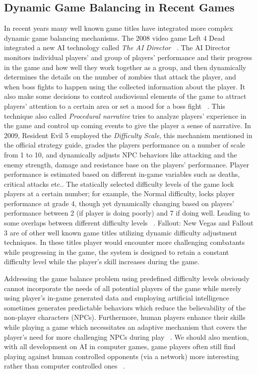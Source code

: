 \subsection{Dynamic Game Balancing in Recent Games}
In recent years many well known game titles have integrated more complex dynamic game balancing mechanisms. The 2008 video game Left 4 Dead integrated a new AI technology called \textit{The AI Director} ~\cite{left2008dead}. The AI Director monitors individual players' and group of players' performance and their progress in the game and how well they work together as a group, and then dynamically determines the details on the number of zombies that attack the player, and when boss fights to happen using the collected information about the player. It also make some decisions to control audiovisual elements of the game to attract players' attention to a certain area or set a mood for a boss fight ~\cite{left4dead2009handson}. This technique also called \textit{Procedural narrative} tries to analyze players' experience in the game and control up coming events to give the player a sense of narrative. In 2009, Resident Evil 5 employed the \textit{Difficulty Scale}, this mechanism mentioned in the official strategy guide, grades the players performance on a number of scale from 1 to 10, and dynamically adjusts NPC behaviors like attacking and the enemy strength, damage and resistance base on the players' performance. Player performance is estimated based on different in-game variables such as deaths, critical attacks etc.. The statically selected difficulty levels of the game lock players at a certain number; for example, the Normal difficulty, locks player performance at grade 4, though yet dynamically changing based on players' performance between 2 (if player is doing poorly) and 7 if doing well. Leading to some overlaps between different difficulty levels ~\cite{resident2009evil}. Fallout: New Vegas and Fallout 3 are of other well known game titles utilizing dynamic difficulty adjustment techniques. In these titles player would encounter more challenging combatants while progressing in the game, the system is designed to retain a constant difficulty level while the player's skill increases during the game.

Addressing the game balance problem using predefined difficulty levels obviously cannot incorporate the needs of all potential players of the game while merely using player's in-game generated data and employing artificial intelligence sometimes generates predictable behaviors which reduce the believability of the non-player characters (NPCs). Furthermore, human players enhance their skills while playing a game which necessitates an adaptive mechanism that covers the player's need for more challenging NPCs during play ~\cite{olesen2008real}. We should also mention, with all development on AI in computer games, game players often still find playing against human controlled opponents (via a network) more interesting rather than computer controlled ones ~\cite{weibel2008playing}.

